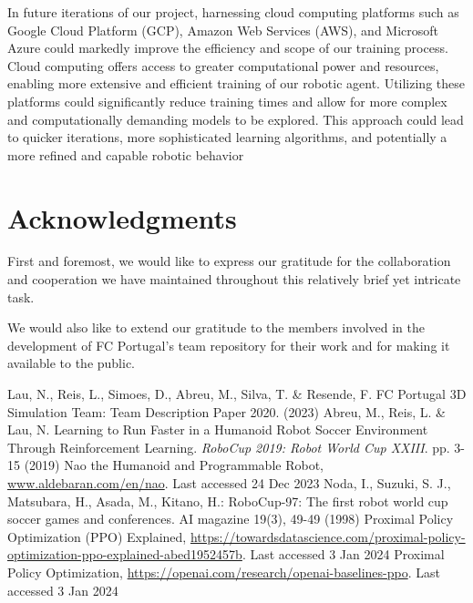 \documentclass[conference]{IEEEtran}
\begin{document}
In future iterations of our project, harnessing cloud computing platforms such as Google Cloud Platform (GCP), Amazon Web Services (AWS), and Microsoft Azure could markedly improve the efficiency and scope of our training process. Cloud computing offers access to greater computational power and resources, enabling more extensive and efficient training of our robotic agent. Utilizing these platforms could significantly reduce training times and allow for more complex and computationally demanding models to be explored. This approach could lead to quicker iterations, more sophisticated learning algorithms, and potentially a more refined and capable robotic behavior



\section{Acknowledgments}\label{Acknowledgments}

First and foremost, we would like to express our gratitude for the collaboration and cooperation we have maintained throughout this relatively brief yet intricate task.

We would also like to extend our gratitude to the members involved in the development of FC Portugal's team repository for their work and for making it available to the public.

\begin{thebibliography}{00}
    Lau, N., Reis, L., Simoes, D., Abreu, M., Silva, T. \& Resende, F. FC Portugal 3D Simulation Team: Team Description Paper 2020.  (2023)
    Abreu, M., Reis, L. \& Lau, N. Learning to Run Faster in a Humanoid Robot Soccer Environment Through Reinforcement Learning. {\em RoboCup 2019: Robot World Cup XXIII}. pp. 3-15 (2019)
     Nao the Humanoid and Programmable Robot, \href{www.aldebaran.com/en/nao}{www.aldebaran.com/en/nao}. Last accessed 24 Dec 2023
     Noda, I., Suzuki, S. J., Matsubara, H., Asada, M., Kitano, H.: RoboCup-97: The first robot world cup soccer games and conferences. AI magazine 19(3), 49-49 (1998)
     Proximal Policy Optimization (PPO) Explained, \href{https://towardsdatascience.com/proximal-policy-optimization-ppo-explained-abed1952457b}{https://towardsdatascience.com/proximal-policy-optimization-ppo-explained-abed1952457b}. Last accessed 3 Jan 2024
     Proximal Policy Optimization, \href{https://openai.com/research/openai-baselines-ppo}{https://openai.com/research/openai-baselines-ppo}. Last accessed 3 Jan 2024
\end{thebibliography}
\end{document}
